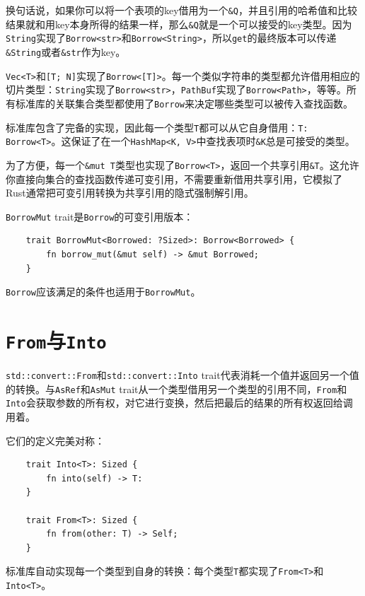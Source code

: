 换句话说，如果你可以将一个表项的key借用为一个\texttt{\&Q}，并且引用的哈希值和比较结果就和用key本身所得的结果一样，那么\texttt{\&Q}就是一个可以接受的key类型。因为\texttt{String}实现了\texttt{Borrow<str>}和\texttt{Borrow<String>}，所以\texttt{get}的最终版本可以传递\texttt{\&String}或者\texttt{\&str}作为key。

\texttt{Vec<T>}和\texttt{[T; N]}实现了\texttt{Borrow<[T]>}。每一个类似字符串的类型都允许借用相应的切片类型：\texttt{String}实现了\texttt{Borrow<str>}，\texttt{PathBuf}实现了\texttt{Borrow<Path>}，等等。所有标准库的关联集合类型都使用了\texttt{Borrow}来决定哪些类型可以被传入查找函数。

标准库包含了完备的实现，因此每一个类型\texttt{T}都可以从它自身借用：\texttt{T: Borrow<T>}。这保证了在一个\texttt{HashMap<K, V>}中查找表项时\texttt{\&K}总是可接受的类型。

为了方便，每一个\texttt{\&mut T}类型也实现了\texttt{Borrow<T>}，返回一个共享引用\texttt{\&T}。这允许你直接向集合的查找函数传递可变引用，不需要重新借用共享引用，它模拟了Rust通常把可变引用转换为共享引用的隐式强制解引用。

\texttt{BorrowMut} trait是\texttt{Borrow}的可变引用版本：
\begin{verbatim}
    trait BorrowMut<Borrowed: ?Sized>: Borrow<Borrowed> {
        fn borrow_mut(&mut self) -> &mut Borrowed;
    }
\end{verbatim}

\texttt{Borrow}应该满足的条件也适用于\texttt{BorrowMut}。

\section{\texttt{From}与\texttt{Into}}\label{from}

\texttt{std::convert::From}和\texttt{std::convert::Into} trait代表消耗一个值并返回另一个值的转换。与\texttt{AsRef}和\texttt{AsMut} trait从一个类型借用另一个类型的引用不同，\texttt{From}和\texttt{Into}会获取参数的所有权，对它进行变换，然后把最后的结果的所有权返回给调用着。

它们的定义完美对称：
\begin{verbatim}
    trait Into<T>: Sized {
        fn into(self) -> T:
    }

    trait From<T>: Sized {
        fn from(other: T) -> Self;
    }
\end{verbatim}

标准库自动实现每一个类型到自身的转换：每个类型\texttt{T}都实现了\texttt{From<T>}和\texttt{Into<T>}。

